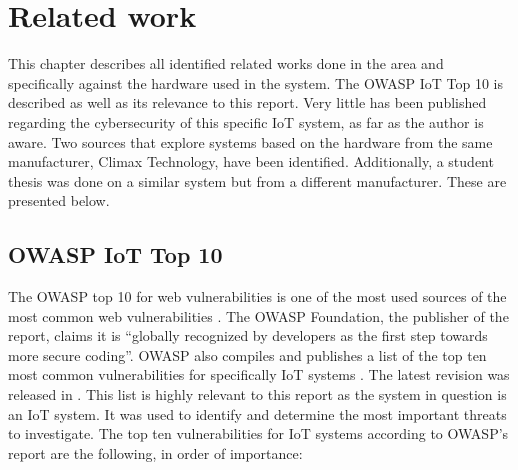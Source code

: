 \chapter{Related work} \label{ch:related-work}
This chapter describes all identified related works done in the area and specifically against the hardware used in the system. The OWASP IoT Top 10 is described as well as its relevance to this report. Very little has been published regarding the cybersecurity of this specific IoT system, as far as the author is aware. Two sources that explore systems based on the hardware from the same manufacturer, Climax Technology, have been identified. Additionally, a student thesis was done on a similar system but from a different manufacturer. These are presented below.

\section{OWASP IoT Top 10} \label{ch:related-work:owasp}
The OWASP top 10 for web vulnerabilities is one of the most used sources of the most common web vulnerabilities \cite{owasp-www-top10}. The OWASP Foundation, the publisher of the report, claims it is \enquote{globally recognized by developers as the first step towards more secure coding}. OWASP also compiles and publishes a list of the top ten most common vulnerabilities for specifically IoT systems \cite{owasp-iot-top10}. The latest revision was released in \citeyear{owasp-iot-top10}. This list is highly relevant to this report as the system in question is an IoT system. It was used to identify and determine the most important threats to investigate. The top ten vulnerabilities for IoT systems according to OWASP's report are the following, in order of importance:
